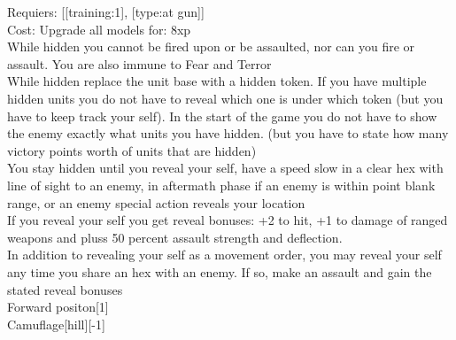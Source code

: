 Requiers: [[training:1], [type:at gun]] \\
Cost: Upgrade all models for: 8xp \\
While hidden you cannot be fired upon or be assaulted, nor can you fire or assault. You are also immune to Fear and Terror\\ 
While hidden replace the unit base with a hidden token. If you have multiple hidden units you do not have to reveal which one is under which token (but you have to keep track your self). In the start of the game you do not have to show the enemy exactly what units you have hidden. (but you have to state how many victory points worth of units that are hidden)\\ 
You stay hidden until you reveal your self, have a speed slow in a clear hex with line of sight to an enemy, in aftermath phase if an enemy is within point blank range, or an enemy special action reveals your location\\ 
If you reveal your self you get reveal bonuses: +2 to hit, +1 to damage of ranged weapons and pluss 50 percent assault strength and deflection.\\ 
In addition to revealing your self as a movement order, you may reveal your self any time you share an hex with an enemy. If so, make an assault and gain the stated reveal bonuses\\ 
Forward positon[1]\\ 
Camuflage[hill][-1]\\ 







